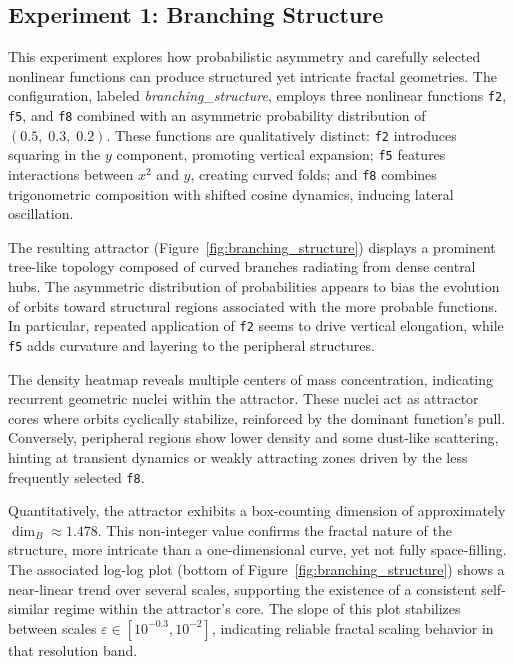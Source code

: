 \documentclass[twocolumn,10pt]{article}
\begin{document}
\subsection{Experiment 1: Branching Structure}
\label{subsec:exp_branching}

This experiment explores how probabilistic asymmetry and carefully selected nonlinear functions can produce structured yet intricate fractal geometries. The configuration, labeled \textit{branching\_structure}, employs three nonlinear functions \texttt{f2}, \texttt{f5}, and \texttt{f8} combined with an asymmetric probability distribution of $(0.5,\; 0.3,\; 0.2)$. These functions are qualitatively distinct: \texttt{f2} introduces squaring in the $y$ component, promoting vertical expansion; \texttt{f5} features interactions between $x^2$ and $y$, creating curved folds; and \texttt{f8} combines trigonometric composition with shifted cosine dynamics, inducing lateral oscillation.

The resulting attractor (Figure~\ref{fig:branching_structure}) displays a prominent tree-like topology composed of curved branches radiating from dense central hubs. The asymmetric distribution of probabilities appears to bias the evolution of orbits toward structural regions associated with the more probable functions. In particular, repeated application of \texttt{f2} seems to drive vertical elongation, while \texttt{f5} adds curvature and layering to the peripheral structures.

The density heatmap reveals multiple centers of mass concentration, indicating recurrent geometric nuclei within the attractor. These nuclei act as attractor cores where orbits cyclically stabilize, reinforced by the dominant function's pull. Conversely, peripheral regions show lower density and some dust-like scattering, hinting at transient dynamics or weakly attracting zones driven by the less frequently selected \texttt{f8}.

Quantitatively, the attractor exhibits a box-counting dimension of approximately $\dim_B \approx 1.478$. This non-integer value confirms the fractal nature of the structure, more intricate than a one-dimensional curve, yet not fully space-filling. The associated log-log plot (bottom of Figure~\ref{fig:branching_structure}) shows a near-linear trend over several scales, supporting the existence of a consistent self-similar regime within the attractor’s core. The slope of this plot stabilizes between scales $\varepsilon \in [10^{-0.3}, 10^{-2}]$, indicating reliable fractal scaling behavior in that resolution band.
\end{document}
